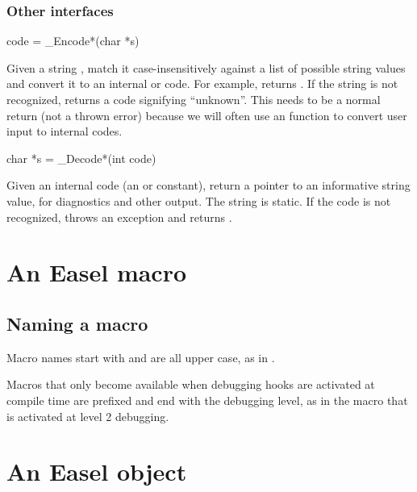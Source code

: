 \subsubsection{Other interfaces}

\begin{sreapi}
\hypertarget{ifc:Encode}
{\item[code = \_Encode*(char *s)]}

Given a string , match it case-insensitively against a list
of possible string values and convert it to an internal
 or  code. For example,
 returns
. If the string is not recognized, returns a
code signifying ``unknown''. This needs to be a normal return (not a
thrown error) because we will often use an  function to
convert user input to internal codes.

\hypertarget{ifc:Decode}
{\item[char *s = \_Decode*(int code)]}

Given an internal code (an  or  constant),
return a pointer to an informative string value, for diagnostics and
other output. The string is static. If the code is not recognized,
throws an  exception and returns .

\end{sreapi}




\section{An Easel macro}

   \subsection{Naming a macro}

Macro names start with  and are all upper case, as in
.

Macros that only become available when debugging hooks are activated
at compile time are prefixed and end with the debugging
level, as in the  macro that is activated at
level 2 debugging.

\section{An Easel object}


